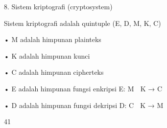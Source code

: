\documentclass{article}
\begin{document}

8.  Sistem kriptografi (cryptosystem) 


    Sistem kriptografi adalah quintuple (E, D, M, K, C)

• M  adalah himpunan plainteks

• K  adalah himpunan kunci

• C  adalah himpunan cipherteks

• E  adalah himpunan fungsi enkripsi E: M  K → C

• D  adalah himpunan fungsi dekripsi D: C  K → M

41
\end{document}
